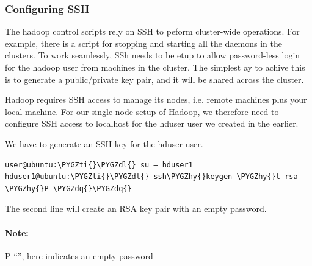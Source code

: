 \documentclass[letterpaper,10pt,english]{sphinxmanual}
\def\PYGZdl{\char`\$}
\def\PYGZhy{\char`\-}
\def\PYGZdq{\char`\"}
\def\PYGZti{\char`\~}
\begin{document}
\subsubsection{Configuring SSH}
\label{hadoop:configuring-ssh}
The hadoop control scripts rely on SSH to peform cluster-wide operations. For example, there is a script for stopping and starting all the daemons in the clusters. To work seamlessly, SSh needs to be etup to allow password-less login for the hadoop user from machines in the cluster. The simplest ay to achive this is to generate a public/private key pair, and it will be shared across the cluster.

Hadoop requires SSH access to manage its nodes, i.e. remote machines plus your local machine. For our single-node setup of Hadoop, we therefore need to configure SSH access to localhost for the hduser user we created in the earlier.

We have to generate an SSH key for the hduser user.

\begin{Verbatim}[commandchars=\\\{\}]
user@ubuntu:\PYGZti{}\PYGZdl{} su – hduser1
hduser1@ubuntu:\PYGZti{}\PYGZdl{} ssh\PYGZhy{}keygen \PYGZhy{}t rsa \PYGZhy{}P \PYGZdq{}\PYGZdq{}
\end{Verbatim}
\begin{figure}[htbp]
\centering

\end{figure}

The second line will create an RSA key pair with an empty password.


\paragraph{Note:}
\label{hadoop:id1}
P “”, here indicates an empty password
\end{document}
